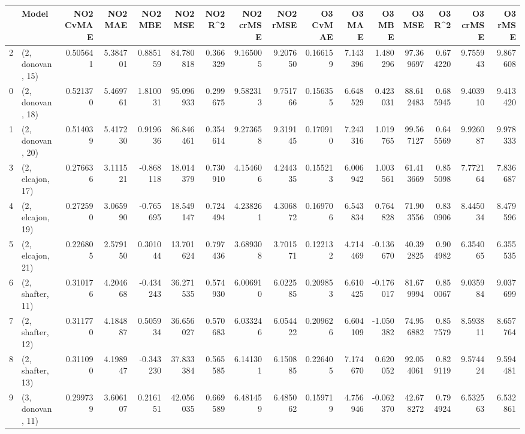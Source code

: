 \begin{tabular}{llrrrrrrrrrrrrrr}
\toprule
{} &             Model &  NO2 CvMAE &   NO2 MAE &   NO2 MBE &    NO2 MSE &   NO2 R\textasciicircum2 &  NO2 crMSE &  NO2 rMSE &  O3 CvMAE &    O3 MAE &    O3 MBE &      O3 MSE &    O3 R\textasciicircum2 &   O3 crMSE &    O3 rMSE \\
\midrule
2  &  (2, donovan, 15) &   0.505641 &  5.384701 &  0.885159 &  84.780818 &  0.366329 &   9.165005 &  9.207650 &  0.166159 &  7.143396 &  1.480296 &   97.369697 &  0.674220 &   9.755943 &   9.867608 \\
0  &  (2, donovan, 18) &   0.521370 &  5.469761 &  1.810031 &  95.096933 &  0.299675 &   9.582313 &  9.751766 &  0.156355 &  6.648529 &  0.423031 &   88.612483 &  0.685945 &   9.403910 &   9.413420 \\
1  &  (2, donovan, 20) &   0.514039 &  5.417230 &  0.919636 &  86.846461 &  0.354614 &   9.273658 &  9.319145 &  0.170910 &  7.243316 &  1.019765 &   99.567127 &  0.645569 &   9.926087 &   9.978333 \\
3  &  (2, elcajon, 17) &   0.276636 &  3.111521 & -0.868118 &  18.014379 &  0.730910 &   4.154606 &  4.244335 &  0.155213 &  6.006942 &  1.003561 &   61.413669 &  0.855098 &   7.772164 &   7.836687 \\
4  &  (2, elcajon, 19) &   0.272590 &  3.065990 & -0.765695 &  18.549147 &  0.724494 &   4.238261 &  4.306872 &  0.169706 &  6.543834 &  0.764828 &   71.903556 &  0.830906 &   8.445034 &   8.479596 \\
5  &  (2, elcajon, 21) &   0.226805 &  2.579150 &  0.301044 &  13.701624 &  0.797436 &   3.689308 &  3.701571 &  0.122132 &  4.714469 & -0.136670 &   40.392825 &  0.904982 &   6.354065 &   6.355535 \\
6  &  (2, shafter, 11) &   0.310176 &  4.204668 & -0.434243 &  36.271535 &  0.574930 &   6.006910 &  6.022585 &  0.209853 &  6.610425 & -0.176017 &   81.679994 &  0.850067 &   9.035984 &   9.037699 \\
7  &  (2, shafter, 12) &   0.311770 &  4.184887 &  0.505934 &  36.656027 &  0.570683 &   6.033246 &  6.054422 &  0.209626 &  6.604109 & -1.050382 &   74.956882 &  0.857579 &   8.593811 &   8.657764 \\
8  &  (2, shafter, 13) &   0.311090 &  4.198947 & -0.343230 &  37.833384 &  0.565585 &   6.141301 &  6.150885 &  0.226405 &  7.174670 &  0.620052 &   92.054061 &  0.829119 &   9.574424 &   9.594481 \\
9  &  (3, donovan, 11) &   0.299739 &  3.606107 &  0.216151 &  42.056035 &  0.669589 &   6.481459 &  6.485062 &  0.159719 &  4.756946 & -0.062370 &   42.678272 &  0.794924 &   6.532563 &   6.532861 \\

\end{tabular}
